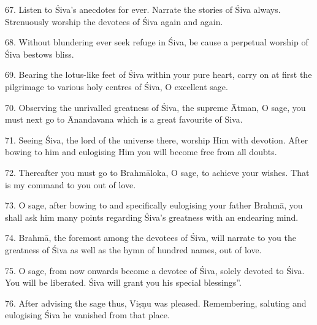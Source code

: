 67. Listen to Śiva’s anecdotes for ever. Narrate the stories of Śiva always.
Strenuously worship the devotees of Śiva again and again.

68. Without blundering ever seek refuge in Śiva, be cause a perpetual worship of
Śiva bestows bliss.

69. Bearing the lotus-like feet of Śiva within your pure heart, carry on at
first the pilgrimage to various holy centres of Śiva, O excellent sage.

70. Observing the unrivalled greatness of Śiva, the supreme Ātman, O sage, you
must next go to Ānandavana which is a great favourite of Siva.

71. Seeing Śiva, the lord of the universe there, worship Him with devotion.
After bowing to him and eulogising Him you will become free from all doubts.

72. Thereafter you must go to Brahmāloka, O sage, to achieve your wishes. That
is my command to you out of love.

73. O sage, after bowing to and specifically eulogising your father Brahmā, you
shall ask him many points regarding Śiva’s greatness with an endearing mind.

74. Brahmā, the foremost among the devotees of Śiva, will narrate to you
the greatness of Śiva as well as the hymn of hundred names, out of love.

75. O sage, from now onwards become a devotee of Śiva, solely devoted to Śiva.
You will be liberated. Śiva will grant you his special blessings”.

76. After advising the sage thus, Viṣṇu was pleased. Remembering, saluting and
eulogising Śiva he vanished from that place.
